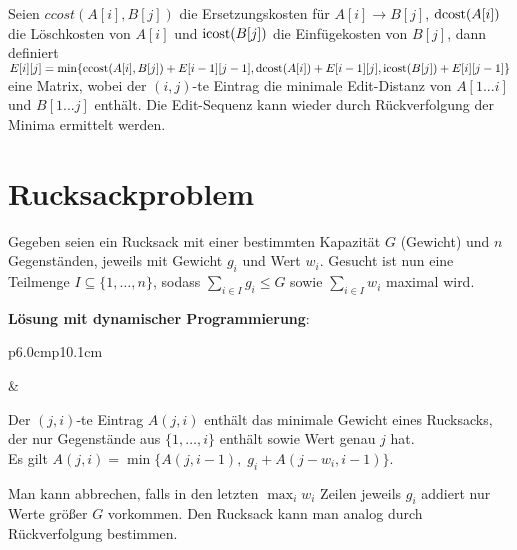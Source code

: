 Seien $ccost(A[i], B[j])$ die Ersetzungskosten für $A[i] \rightarrow B[j]$,
$\operatorname{dcost}(A[i])$ die Löschkosten von $A[i]$ und
$\operatorname{icost}(B[j])$ die Einfügekosten von $B[j]$, dann definiert \\
$E[i][j] = \min\{\operatorname{ccost}(A[i], B[j]) + E[i - 1][j - 1],
\operatorname{dcost}(A[i]) + E[i - 1][j],
\operatorname{icost}(B[j]) + E[i][j - 1]\}$ \\
eine Matrix, wobei der $(i, j)$-te Eintrag die minimale Edit-Distanz
von $A[1 ... i]$ und $B[1 ... j]$ enthält.
Die Edit-Sequenz kann wieder durch Rückverfolgung der Minima ermittelt werden.

\section{%
    Rucksackproblem%
}

Gegeben seien ein Rucksack mit einer bestimmten Kapazität $G$ (Gewicht) und
$n$ Gegenständen, jeweils mit Gewicht $g_i$ und Wert $w_i$.
Gesucht ist nun eine Teilmenge $I \subseteq \{1, \dotsc, n\}$, sodass
$\sum_{i \in I} g_i \le G$ sowie $\sum_{i \in I} w_i$ maximal wird.

\linie

\textbf{Lösung mit dynamischer Programmierung}: \\
\begin{tabular}{p{6.0cm}p{10.1cm}}
    \begin{minipage}[c]{6.0cm}
    \end{minipage} &
    \begin{minipage}[c]{10.1cm}
        Der $(j, i)$-te Eintrag $A(j, i)$ enthält das minimale Gewicht
        eines Rucksacks, der nur Gegenstände aus $\{1, \dotsc, i\}$ enthält
        sowie Wert genau $j$ hat. \\
        Es gilt
        $A(j, i) = \min\{A(j, i - 1),\; g_i + A(j - w_i, i - 1)\}$.
    \end{minipage}
\end{tabular}

Man kann abbrechen, falls in den letzten $\max_i w_i$ Zeilen jeweils
$g_i$ addiert nur Werte größer $G$ vorkommen.
Den Rucksack kann man analog durch Rückverfolgung bestimmen.

\pagebreak
